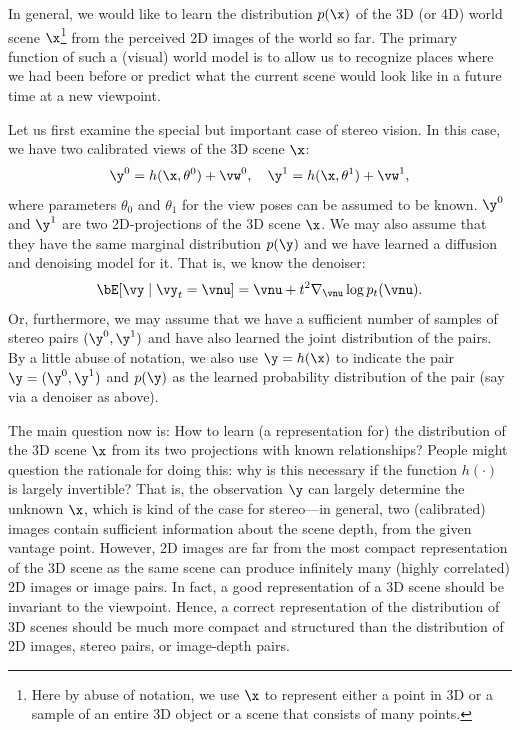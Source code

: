 \documentclass[../../book-main.tex]{subfiles}
\begin{document}
In general, we would like to learn the distribution $p(\x)$ of the 3D (or 4D) world scene $\x$\footnote{Here by abuse of notation, we use $\x$ to represent either a point in 3D or a sample of an entire 3D object or a scene that consists of many points.} from the perceived 2D images of the world so far. The primary function of such a (visual) world model is to allow us to recognize places where we had been before or predict what the current scene would look like in a future time at a new viewpoint. 

Let us first examine the special but important case of stereo vision. In this case, we have two calibrated views of the 3D scene $\x$:
\begin{equation}
    \y^0 = h(\x, \theta^0) +\vw^0, \quad \y^1 = h(\x, \theta^1) +\vw^1, 
\end{equation}
where parameters $\theta_0$ and $\theta_1$ for the view poses can be assumed to be known. $\y^0$ and $\y^1$ are two 2D-projections of the 3D scene $\x$. We may also assume that they have the same marginal distribution $p(\y)$ and we have learned a diffusion and denoising model for it. That is, we know the denoiser:
\begin{equation}
  \bE[\vy \mid \vy_t=\vnu] =
  \vnu + t^2 \nabla_{\vnu}\log p_t(\vnu). 
 \label{eq:y-posterior-sampling-denoiser}    
\end{equation}
Or, furthermore, we may assume that we have a sufficient number of samples of stereo pairs $(\y^0, \y^1)$ and have also learned the joint distribution of the pairs. By a little abuse of notation, we also use $\y = h(\x)$ to indicate the pair $\y = (\y^0, \y^1)$ and $p(\y)$ as the learned probability distribution of the pair (say via a denoiser as above).  

The main question now is: How to learn (a representation for) the distribution of the 3D scene $\x$ from its two projections with known relationships? 
People might question the rationale for doing this: why is this necessary if the function $h(\cdot)$ is largely invertible? That is, the observation $\y$ can largely determine the unknown $\x$, which is kind of the case for stereo—in general, two (calibrated) images contain sufficient information about the scene depth, from the given vantage point. However, 2D images are far from the most compact representation of the 3D scene as the same scene can produce infinitely many (highly correlated) 2D images or image pairs. In fact, a good representation of a 3D scene should be invariant to the viewpoint. Hence, a correct representation of the distribution of 3D scenes should be much more compact and structured than the distribution of 2D images, stereo pairs, or image-depth pairs. 
\end{document}
